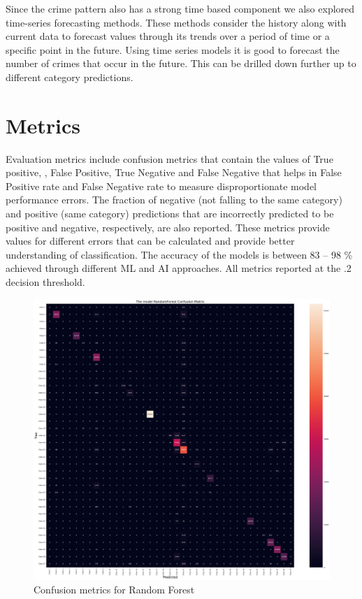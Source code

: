 \documentclass[conference,final,]{IEEEtran}
\begin{document}
Since the crime pattern also has a strong time based component we also
explored time-series forecasting methods. These methods consider the
history along with current data to forecast values through its trends over a period of
time or a specific point in the future. Using time series models
it is good to forecast the number of crimes that occur in the future.
This can be drilled down further up to different category predictions.

\section{Metrics}\label{metrics}

Evaluation metrics include confusion metrics that contain the values of
True positive, , False Positive, True Negative and False Negative that
helps in False Positive rate and False Negative rate to measure
disproportionate model performance errors. The fraction of negative (not
falling to the same category) and positive (same category) predictions
that are incorrectly predicted to be positive and negative,
respectively, are also reported. These metrics provide values for
different errors that can be calculated and provide better understanding
of classification. The accuracy of the models is between 83 -- 98 \%
achieved through different ML and AI approaches. All metrics reported at
the .2 decision threshold.

\begin{figure}

{\centering \includegraphics[width=0.7\linewidth]{img/fig12} 

}

\caption{Confusion metrics for Random Forest}\label{fig:unnamed-chunk-12}
\end{figure}
\end{document}
